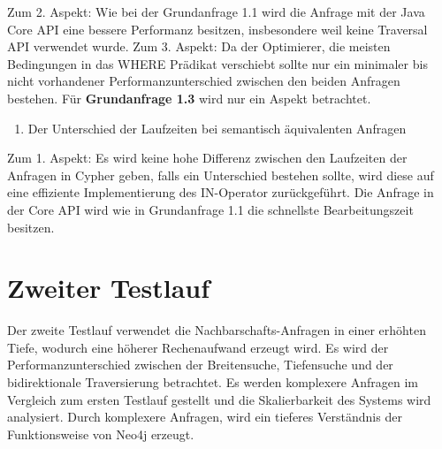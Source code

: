 Zum 2. Aspekt: Wie bei der Grundanfrage 1.1 wird   die Anfrage mit der Java Core API eine bessere Performanz besitzen, insbesondere weil keine Traversal API verwendet wurde. \newline
Zum 3. Aspekt: Da der Optimierer, die meisten Bedingungen in das WHERE Prädikat verschiebt sollte nur ein minimaler bis nicht vorhandener Performanzunterschied zwischen den beiden Anfragen bestehen. \newline \newline
Für \textbf{Grundanfrage 1.3} wird nur ein Aspekt betrachtet.
\begin{enumerate}
	\item Der Unterschied der Laufzeiten bei semantisch äquivalenten Anfragen 
\end{enumerate}
Zum 1. Aspekt: Es wird keine hohe Differenz zwischen den Laufzeiten der Anfragen in Cypher geben, falls ein Unterschied bestehen sollte, wird diese auf eine effiziente Implementierung des IN-Operator zurückgeführt. Die Anfrage in der Core API wird wie in Grundanfrage 1.1 die schnellste Bearbeitungszeit besitzen.

\section{Zweiter Testlauf}
Der zweite Testlauf verwendet die Nachbarschafts-Anfragen in einer erhöhten Tiefe, wodurch eine höherer Rechenaufwand erzeugt wird. Es wird der Performanzunterschied zwischen der Breitensuche, Tiefensuche und der bidirektionale Traversierung betrachtet. Es werden komplexere Anfragen im Vergleich zum ersten Testlauf gestellt und die Skalierbarkeit des Systems wird analysiert. Durch komplexere Anfragen, wird ein tieferes Verständnis der Funktionsweise von Neo4j erzeugt. 
